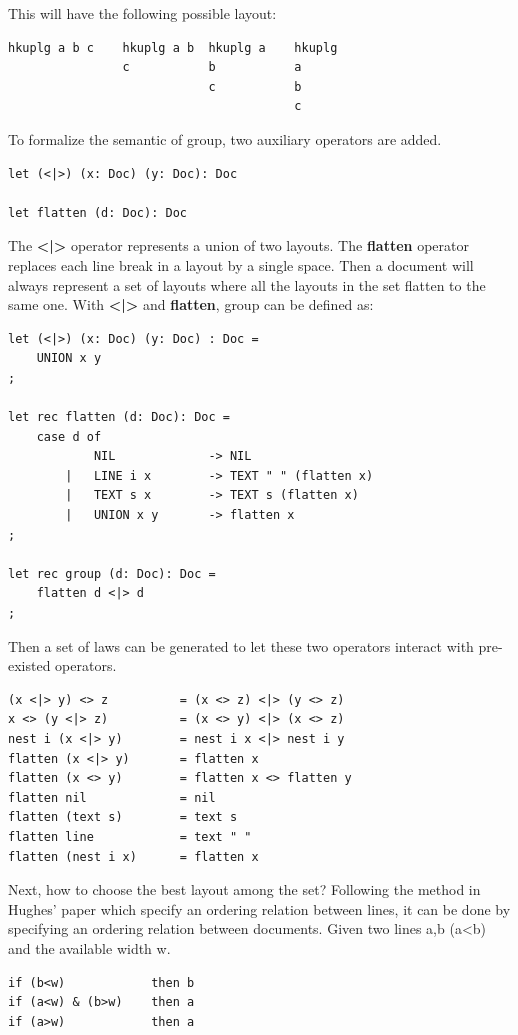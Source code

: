 This will have the following possible layout:
\begin{lstlisting}[language=Haskell]
hkuplg a b c    hkuplg a b  hkuplg a    hkuplg
                c           b           a
                            c           b
                                        c
\end{lstlisting}

To formalize the semantic of group, two auxiliary operators are added.
\begin{lstlisting}
let (<|>) (x: Doc) (y: Doc): Doc

let flatten (d: Doc): Doc
\end{lstlisting}

The \textbf{<|>} operator represents a union of two layouts. The \textbf{flatten} operator replaces each line break in a layout by a single space. Then a document will always represent a set of layouts where all the layouts in the set flatten to the same one. With \textbf{<|>} and \textbf{flatten}, group can be defined as:
\begin{lstlisting}
let (<|>) (x: Doc) (y: Doc) : Doc =
    UNION x y
;

let rec flatten (d: Doc): Doc =
    case d of
            NIL             -> NIL
        |   LINE i x        -> TEXT " " (flatten x)
        |   TEXT s x        -> TEXT s (flatten x)
        |   UNION x y       -> flatten x
;

let rec group (d: Doc): Doc =
    flatten d <|> d
;
\end{lstlisting}

Then a set of laws can be generated to let these two operators interact with pre-existed operators.
\begin{lstlisting}
(x <|> y) <> z          = (x <> z) <|> (y <> z)
x <> (y <|> z)          = (x <> y) <|> (x <> z)
nest i (x <|> y)        = nest i x <|> nest i y
flatten (x <|> y)       = flatten x
flatten (x <> y)        = flatten x <> flatten y
flatten nil             = nil
flatten (text s)        = text s
flatten line            = text " "
flatten (nest i x)      = flatten x
\end{lstlisting}

Next, how to choose the best layout among the set? Following the method in Hughes' paper\cite{hughes1995design} which specify an ordering relation between lines, it can be done by specifying an ordering relation between documents. Given two lines a,b (a<b) and the available width w.
\begin{lstlisting}
if (b<w)            then b
if (a<w) & (b>w)    then a
if (a>w)            then a
\end{lstlisting}

